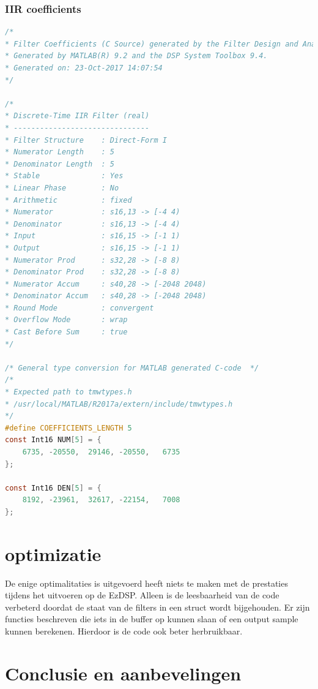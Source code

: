 \documentclass[11pt,a4paper]{article}
\begin{document}
	\subsubsection{IIR coefficients}
	\begin{lstlisting}[language=c]
/*
* Filter Coefficients (C Source) generated by the Filter Design and Analysis Tool
* Generated by MATLAB(R) 9.2 and the DSP System Toolbox 9.4.
* Generated on: 23-Oct-2017 14:07:54
*/

/*
* Discrete-Time IIR Filter (real)
* -------------------------------
* Filter Structure    : Direct-Form I
* Numerator Length    : 5
* Denominator Length  : 5
* Stable              : Yes
* Linear Phase        : No
* Arithmetic          : fixed
* Numerator           : s16,13 -> [-4 4)
* Denominator         : s16,13 -> [-4 4)
* Input               : s16,15 -> [-1 1)
* Output              : s16,15 -> [-1 1)
* Numerator Prod      : s32,28 -> [-8 8)
* Denominator Prod    : s32,28 -> [-8 8)
* Numerator Accum     : s40,28 -> [-2048 2048)
* Denominator Accum   : s40,28 -> [-2048 2048)
* Round Mode          : convergent
* Overflow Mode       : wrap
* Cast Before Sum     : true
*/

/* General type conversion for MATLAB generated C-code  */
/* 
* Expected path to tmwtypes.h 
* /usr/local/MATLAB/R2017a/extern/include/tmwtypes.h 
*/
#define COEFFICIENTS_LENGTH 5
const Int16 NUM[5] = {
	6735, -20550,  29146, -20550,   6735
};

const Int16 DEN[5] = {
	8192, -23961,  32617, -22154,   7008
};	   
	\end{lstlisting}
	\clearpage

	\section{optimizatie}
	De enige optimalitaties is uitgevoerd heeft niets te maken met de prestaties tijdens het uitvoeren op de EzDSP. Alleen is de leesbaarheid van de code verbeterd doordat de staat van de filters in een struct wordt bijgehouden. Er zijn functies beschreven die iets in de buffer op kunnen slaan of een output sample kunnen berekenen. Hierdoor is de code ook beter herbruikbaar.
	

	\section{Conclusie en aanbevelingen}
	
	
	
		
\end{document}
